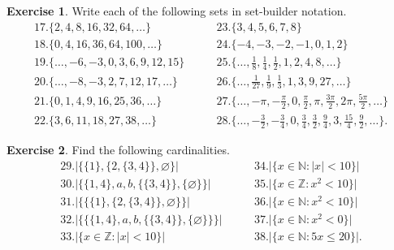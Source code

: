 \documentclass{article}
\theoremstyle{definition}
\newtheorem{exercise}{Exercise}[section]
\newcommand{\N}{\mathbb{N}}
\newcommand{\Z}{\mathbb{Z}}
\begin{document}
\begin{exercise}
    Write each of the following sets in set-builder notation.
    $$
    \begin{aligned}
    17. \{ 2,4,8,16,32,64,\dots \} &\quad\quad 23. \{ 3,4,5,6,7,8 \}\\
    18. \{ 0,4,16,36,64,100,\dots \} &\quad\quad 24. \{ -4,-3,-2,-1,0,1,2 \}\\
    19. \{ \dots,-6,-3,0,3,6,9,12,15 \} &\quad\quad 25. \{ \dots,\frac{1}{8},\frac{1}{4},\frac{1}{2},1,2,4,8,\dots \}\\
    20. \{ \dots,-8,-3,2,7,12,17,\dots \} &\quad\quad 26. \{ \dots,\frac{1}{27},\frac{1}{9},\frac{1}{3},1,3,9,27,\dots \}\\
    21. \{ 0,1,4,9,16,25,36,\dots \} &\quad\quad 27. \{ \dots,-\pi,-\frac{\pi}{2},0,\frac{\pi}{2}, \pi,\frac{3\pi}{2},2\pi,\frac{5\pi}{2},\dots \}\\
    22. \{ 3,6,11,18,27,38,\dots \} &\quad\quad 28.\{ \dots,-\frac{3}{2},-\frac{3}{4},0,\frac{3}{4},\frac{3}{2},\frac{9}{4},3,\frac{15}{4},\frac{9}{2},\dots \}.
    \end{aligned}
    $$
\end{exercise}

\begin{exercise}
    Find the following cardinalities. 
    $$
    \begin{aligned}
    29. \lvert \{ \{ 1 \},\{ 2,\{ 3,4 \} \},\varnothing \} \rvert &\quad\quad 34. \lvert \{ x\in\N:\lvert x \rvert<10 \} \rvert\\
    30. \lvert \{ \{ 1,4 \},a,b,\{ \{ 3,4 \} \},\{ \varnothing \} \} \rvert &\quad\quad 35. \lvert \{ x\in\Z:x^2<10 \} \rvert\\
    31. \lvert \{ \{ \{ 1 \},\{ 2, \{ 3,4 \} \},\varnothing \} \} \rvert &\quad\quad 36. \lvert \{ x\in\N:x^2<10 \} \rvert\\
    32. \lvert \{ \{ \{ 1,4 \},a,b,\{ \{ 3,4 \} \},\{ \varnothing \} \} \} \rvert &\quad\quad 37. \lvert \{ x\in\N:x^2<0 \} \rvert\\
    33. \lvert \{ x\in\Z: \lvert x \rvert<10 \} \rvert &\quad\quad 38. \lvert \{ x\in\N:5x\le 20 \} \rvert.
    \end{aligned}
    $$
\end{exercise}
\end{document}
